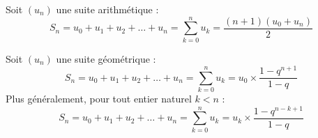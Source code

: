 \documentclass[11pt]{article}
\begin{document}
\begin{theoreme}
Soit $(u_n)$ une suite arithmétique :
\[ S_n = u_0 + u_1 + u_2 + \ldots + u_n = \sum_{k=0}^{n} u_k = \dfrac{(n+1)(u_0+u_n)}{2} \]
\end{theoreme}

\begin{theoreme}
Soit $(u_n)$ une suite géométrique :
\[ S_n = u_0 + u_1 + u_2 + \ldots + u_n = \sum_{k=0}^{n} u_k = u_0
\times \dfrac{1-q^{n+1}}{1-q} \]
Plus généralement, pour tout entier naturel $k<n$ :
\[ S_n = u_0 + u_1 + u_2 + \ldots + u_n = \sum_{k=0}^{n} u_k = u_k
\times \dfrac{1-q^{n-k+1}}{1-q} \]
\end{theoreme}
\end{document}
